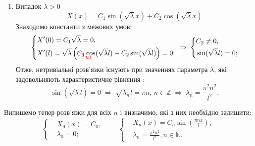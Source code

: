\documentclass[a4paper, 14pt]{extreport}
\begin{document}
\begin{enumerate}
\begin{enumerate}[wide, labelindent=0pt]
        \item Випадок $\lambda > 0$
        \begin{equation*}
            X(x) = C_1 \sin(\sqrt{\lambda}x) + C_2 \cos({\sqrt{\lambda}x})
        \end{equation*}
        Знаходимо константи з межових умов:
        \begin{equation*}
            \begin{aligned}
                \left\{ \begin{aligned}
                    &X'(0) = C_1\sqrt{\lambda} = 0, \\ 
                    &X'(l) = \sqrt{\lambda}\left(\textcolor{red}{\begin{xy}*{\textcolor{black}{C_1}};p+LU;+RD**h@{}+//**h@{-}*h@{>}*h!LD{\scriptstyle 0}\end{xy}} \cos({\sqrt{\lambda}l}) - C_2 \sin(\sqrt{\lambda}l)\right) = 0;
                \end{aligned} \right.
                \;\Rightarrow\;
                \left\{ \begin{aligned}
                    &C_2 \neq 0, \\ 
                    &\sin(\sqrt{\lambda}l) = 0;
                \end{aligned} \right.
            \end{aligned}
        \end{equation*}
        Отже, нетривіальні розв'язки існують при значеннях параметра $\lambda$, які задовольняють характеристичне рівняння :
        \begin{equation*}
            \sin(\sqrt{\lambda}l) = 0
            \;\Rightarrow\;
            \sqrt{\lambda_n}l = \pi n, \, n \in \mathbb{Z}
            \;\Rightarrow\;
            \lambda_n = \frac{\pi^2 n^2}{l^2}.
        \end{equation*}
    \end{enumerate}
\end{enumerate} 
Випишемо тепер розв'язки для всіх $n$ і визначимо, які з них необхідно залишити:
    \begin{equation*}
        \left\{ \begin{aligned}
            &X_0(x) = C_0,\\
            &\lambda_0 = 0;
        \end{aligned} \right.
        \qquad
        \left\{ \begin{aligned}
            &X_n(x) = C_n \sin\left(\frac{\pi n x}{l}\right),\\
            &\lambda_n = \frac{\pi^2 n^2}{l^2}, n \in \mathbb{N}.
        \end{aligned} \right.
    \end{equation*}
\end{document}
